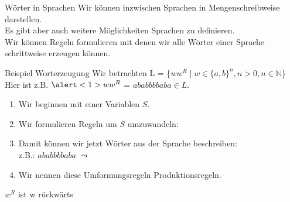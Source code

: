 %
%
%
%

\begin{frame}[fragile]{Wörter in Sprachen}
Wir können inzwischen Sprachen in Mengenschreibweise darstellen.\\Es gibt aber auch weitere Möglichkeiten Sprachen zu definieren.\\
\vspace{0.3cm}
Wir können Regeln formulieren mit denen wir alle Wörter einer Sprache schrittweise erzeugen können.
\end{frame}

\begin{frame}[fragile]{Beispiel Worterzeugung}
    \small{Wir betrachten L = \{$ww^R \mid w \in \{a, b\}^n, n>0, n\in \mathbb{N}$\}\\
    Hier ist z.B. $\alert<1>{w}w^R$ = \alert<1>{$ababb$}$bbaba\in L$.}\\
    \begin{enumerate}
    \item <2-> 
            \alert<2,5>{Wir beginnen mit einer Variablen $S$.}
    \item <3-> 
            \alert<3>{Wir formulieren Regeln um $S$ umzuwandeln:}
            \alert<4>{}\vspace{-0.3in}
    \item <5->
            \alert<5>{Damit können wir jetzt Wörter aus der Sprache beschreiben:}\\
            z.B.: \alert<6>{$a$}\alert<7>{$b$}\alert<8>{$a$}\alert<9>{$b$}\alert<10>{$bb$}\alert<9>{$b$}\alert<8>{$a$}\alert<7>{$b$}\alert<6>{$a$} 
            $\leadsto$ 
    \item <11> \alert<11>{Wir nennen diese Umformungsregeln Produktionsregeln.}
    \end{enumerate}
    \vspace{1cm}
    \footnotesize{$w^R$ ist w rückwärts}
\end{frame}

